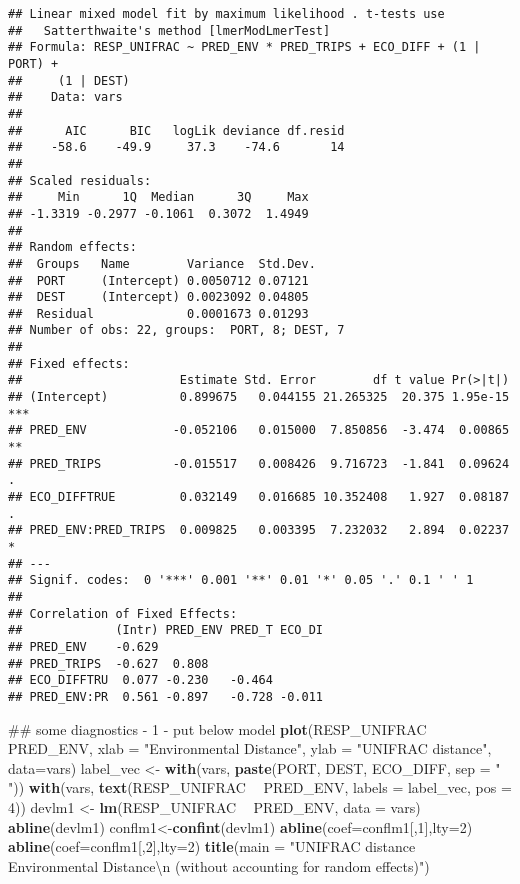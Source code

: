 \documentclass[]{article}
\newenvironment{Shaded}{\begin{snugshade}}{\end{snugshade}}
\newcommand{\KeywordTok}[1]{\textcolor[rgb]{0.13,0.29,0.53}{\textbf{#1}}}
\newcommand{\DataTypeTok}[1]{\textcolor[rgb]{0.13,0.29,0.53}{#1}}
\newcommand{\DecValTok}[1]{\textcolor[rgb]{0.00,0.00,0.81}{#1}}
\newcommand{\CharTok}[1]{\textcolor[rgb]{0.31,0.60,0.02}{#1}}
\newcommand{\StringTok}[1]{\textcolor[rgb]{0.31,0.60,0.02}{#1}}
\newcommand{\OperatorTok}[1]{\textcolor[rgb]{0.81,0.36,0.00}{\textbf{#1}}}
\newcommand{\NormalTok}[1]{#1}
\begin{document}
\begin{verbatim}
## Linear mixed model fit by maximum likelihood . t-tests use
##   Satterthwaite's method [lmerModLmerTest]
## Formula: RESP_UNIFRAC ~ PRED_ENV * PRED_TRIPS + ECO_DIFF + (1 | PORT) +  
##     (1 | DEST)
##    Data: vars
## 
##      AIC      BIC   logLik deviance df.resid 
##    -58.6    -49.9     37.3    -74.6       14 
## 
## Scaled residuals: 
##     Min      1Q  Median      3Q     Max 
## -1.3319 -0.2977 -0.1061  0.3072  1.4949 
## 
## Random effects:
##  Groups   Name        Variance  Std.Dev.
##  PORT     (Intercept) 0.0050712 0.07121 
##  DEST     (Intercept) 0.0023092 0.04805 
##  Residual             0.0001673 0.01293 
## Number of obs: 22, groups:  PORT, 8; DEST, 7
## 
## Fixed effects:
##                      Estimate Std. Error        df t value Pr(>|t|)    
## (Intercept)          0.899675   0.044155 21.265325  20.375 1.95e-15 ***
## PRED_ENV            -0.052106   0.015000  7.850856  -3.474  0.00865 ** 
## PRED_TRIPS          -0.015517   0.008426  9.716723  -1.841  0.09624 .  
## ECO_DIFFTRUE         0.032149   0.016685 10.352408   1.927  0.08187 .  
## PRED_ENV:PRED_TRIPS  0.009825   0.003395  7.232032   2.894  0.02237 *  
## ---
## Signif. codes:  0 '***' 0.001 '**' 0.01 '*' 0.05 '.' 0.1 ' ' 1
## 
## Correlation of Fixed Effects:
##             (Intr) PRED_ENV PRED_T ECO_DI
## PRED_ENV    -0.629                       
## PRED_TRIPS  -0.627  0.808                
## ECO_DIFFTRU  0.077 -0.230   -0.464       
## PRED_ENV:PR  0.561 -0.897   -0.728 -0.011
\end{verbatim}

\begin{Shaded}
\begin{Highlighting}[]
\NormalTok{## some diagnostics - 1 - put below model}
\KeywordTok{plot}\NormalTok{(RESP_UNIFRAC }\OperatorTok{~}\StringTok{ }\NormalTok{PRED_ENV, }\DataTypeTok{xlab =} \StringTok{"Environmental Distance"}\NormalTok{, }\DataTypeTok{ylab =} \StringTok{"UNIFRAC distance"}\NormalTok{, }\DataTypeTok{data=}\NormalTok{vars)}
\NormalTok{label_vec <-}\StringTok{ }\KeywordTok{with}\NormalTok{(vars, }\KeywordTok{paste}\NormalTok{(PORT, DEST, ECO_DIFF,  }\DataTypeTok{sep =} \StringTok{" "}\NormalTok{))}
\KeywordTok{with}\NormalTok{(vars, }\KeywordTok{text}\NormalTok{(RESP_UNIFRAC }\OperatorTok{~}\StringTok{ }\NormalTok{PRED_ENV, }\DataTypeTok{labels =}\NormalTok{ label_vec, }\DataTypeTok{pos =} \DecValTok{4}\NormalTok{))}
\NormalTok{devlm1 <-}\StringTok{ }\KeywordTok{lm}\NormalTok{(RESP_UNIFRAC }\OperatorTok{~}\StringTok{ }\NormalTok{PRED_ENV, }\DataTypeTok{data =}\NormalTok{ vars)}
\KeywordTok{abline}\NormalTok{(devlm1)}
\NormalTok{conflm1<-}\KeywordTok{confint}\NormalTok{(devlm1)}
\KeywordTok{abline}\NormalTok{(}\DataTypeTok{coef=}\NormalTok{conflm1[,}\DecValTok{1}\NormalTok{],}\DataTypeTok{lty=}\DecValTok{2}\NormalTok{)}
\KeywordTok{abline}\NormalTok{(}\DataTypeTok{coef=}\NormalTok{conflm1[,}\DecValTok{2}\NormalTok{],}\DataTypeTok{lty=}\DecValTok{2}\NormalTok{) }
\KeywordTok{title}\NormalTok{(}\DataTypeTok{main =} \StringTok{"UNIFRAC distance ~ Environmental Distance}\CharTok{\textbackslash{}n}\StringTok{ (without accounting for random effects)"}\NormalTok{)}
\end{Highlighting}
\end{Shaded}
\end{document}
